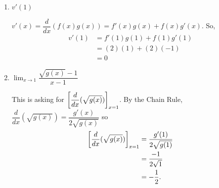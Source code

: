 \documentclass{ximera}
\begin{document}
\begin{problem}
\begin{enumerate}
	
  \item $v'(1)$
\begin{explanation}
      $v'(x) = \dfrac{d}{dx}(f(x)g(x)) = f'(x)g(x) + f(x)g'(x)$.  So,
      \begin{align*}
        v'(1) &= f'(1) g(1) + f(1) g'(1) \\
              &= (2)(1) + (2)(-1) \\
              &= 0
      \end{align*}
    \end{explanation}

  \item $\displaystyle \lim_{x\to 1} \dfrac{\sqrt{g(x)}-1}{x-1}$
\begin{explanation}
	This is asking for $\bigg[ \dfrac{d}{dx}( \sqrt{g(x)} ) \bigg]_{x=1}$. 
	By the Chain Rule, $\dfrac{d}{dx}( \sqrt{g(x)} ) = \dfrac{g'(x)}{2\sqrt{g(x)}}$ so 
	\begin{align*}
		\bigg[ \dfrac{d}{dx}( \sqrt{g(x)} ) \bigg]_{x=1} &= \dfrac{g'(1)}{2\sqrt{g(1)}}\\
			&= \dfrac{-1}{2\sqrt{1}}\\
			&= -\dfrac{1}{2}.
	\end{align*}
    \end{explanation}
  \end{enumerate}		
			
	
		
\end{problem}
\end{document}
